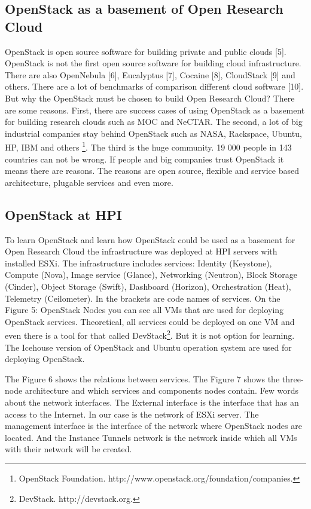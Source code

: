 \subsection{OpenStack as a basement of Open Research Cloud}
OpenStack is open source software for building private and public clouds [5]. OpenStack is not the first open source software for building cloud infrastructure. There are also OpenNebula [6], Eucalyptus [7], Cocaine [8], CloudStack [9] and others. There are a lot of benchmarks of comparison different cloud software [10]. But why the OpenStack must be chosen to build Open Research Cloud? There are some reasons. First, there are success cases of using OpenStack as a basement for building research clouds such as MOC and NeCTAR. The second, a lot of big industrial companies stay behind OpenStack such as NASA, Rackspace, Ubuntu, HP, IBM and others \footnote{OpenStack Foundation. http://www.openstack.org/foundation/companies.}. The third is the huge community. 19 000 people in 143 countries can not be wrong. If people and big companies trust OpenStack it means there are reasons. The reasons are open source, flexible and service based architecture, plugable services and even more.  


\subsection{OpenStack at HPI}
To learn OpenStack and learn how OpenStack could be used as a basement for Open Research Cloud the infrastructure was deployed at HPI servers with installed ESXi. The infrastructure includes services: Identity (Keystone), Compute (Nova), Image service (Glance), Networking (Neutron), Block Storage (Cinder), Object Storage (Swift), Dashboard (Horizon), Orchestration (Heat), Telemetry (Ceilometer). In the brackets are code names of services. On the Figure 5: OpenStack Nodes you can see all VMs that are used for deploying OpenStack services. Theoretical, all services could be deployed on one VM and even there is a tool for that called DevStack\footnote{DevStack. http://devstack.org.}. But it is not option for learning. The Icehouse version of OpenStack and Ubuntu operation system are used for deploying OpenStack.  

The Figure 6 shows the relations between services. The Figure 7 shows the three-node architecture and which services and components nodes contain. Few words about the network interfaces. The External interface is the interface that has an access to the Internet. In our case is the network of ESXi server. The management interface is the interface of the network where OpenStack nodes are located. And the Instance Tunnels network is the network inside which all VMs with their network will be created. 


